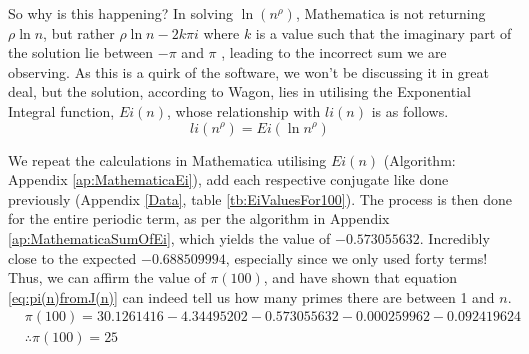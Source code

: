So why is this happening? In solving $\ln(n^{\rho})$, Mathematica is not returning $\rho \ln n$, but rather $\rho \ln n - 2k\pi i$ where $k$ is a value such that the imaginary part of the solution lie between $-\pi$ and $\pi$ \citep[p.548]{wagon1999mathematica}, leading to the incorrect sum we are observing. As this is a quirk of the software, we won't be discussing it in great deal, but the solution, according to Wagon, lies in utilising the Exponential Integral function, $Ei(n)$, whose relationship with $li(n)$ is as follows.
\begin{equation*}
	li(n^{\rho}) = Ei( \ln n^{\rho} )
\end{equation*}

We repeat the calculations in Mathematica utilising $Ei(n)$ (Algorithm: Appendix \ref{ap:MathematicaEi}), add each respective conjugate like done previously (Appendix \ref{Data}, table \ref{tb:EiValuesFor100}). The process is then done for the entire periodic term, as per the algorithm in Appendix \ref{ap:MathematicaSumOfEi}, which yields the value of $-0.573055632$. Incredibly close to the expected $-0.688509994$, especially since we only used forty terms! Thus, we can affirm the value of $\pi(100)$, and have shown that equation \ref{eq:pi(n)fromJ(n)} can indeed tell us how many primes there are between 1 and $n$.
\begin{equation*}
\begin{split}
	&\pi(100) = 30.1261416 - 4.34495202 -0.573055632 - 0.000259962 - 0.092419624\\
	&\therefore  \pi(100) = 25
\end{split}
\end{equation*}